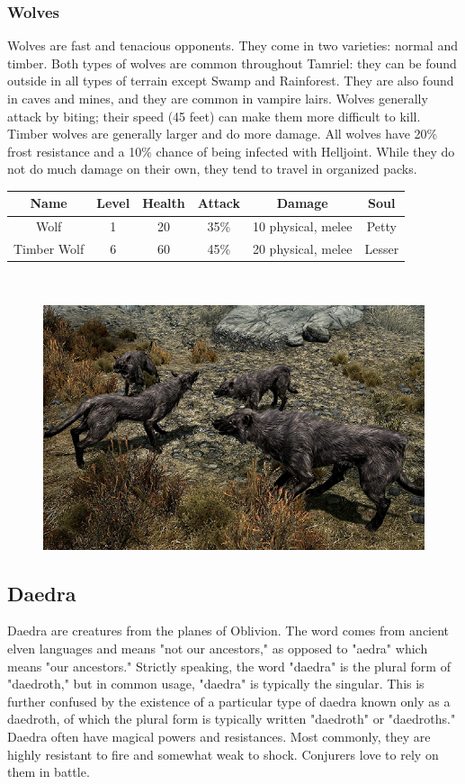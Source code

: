 \documentclass[12pt]{book}
\begin{document}
\subsubsection{Wolves}
Wolves are fast and tenacious opponents. They come in two varieties: normal and timber. Both types of wolves are common throughout Tamriel: they can be found outside in all types of terrain except Swamp and Rainforest. They are also found in caves and mines, and they are common in vampire lairs. Wolves generally attack by biting; their speed (45 feet) can make them more difficult to kill. Timber wolves are generally larger and do more damage. All wolves have 20\% frost resistance and a 10\% chance of being infected with Helljoint. While they do not do much damage on their own, they tend to travel in organized packs.

\begin{tabular}{|c|c|c|c|c|c|}
\hline
Name & Level & Health & Attack & Damage & Soul\\ \hline
Wolf & 1 & 20 & 35\% & 10 physical, melee & Petty\\ \hline
Timber Wolf & 6 & 60 & 45\% & 20 physical, melee & Lesser\\ \hline
\end{tabular}\\

\begin{figure}[h]
	\centering
	\includegraphics[scale=0.8]{wolves.png}
\end{figure}

\subsection{Daedra}
Daedra are creatures from the planes of Oblivion. The word comes from ancient elven languages and means "not our ancestors," as opposed to "aedra" which means "our ancestors." Strictly speaking, the word "daedra" is the plural form of "daedroth," but in common usage, "daedra" is typically the singular. This is further confused by the existence of a particular type of daedra known only as a daedroth, of which the plural form is typically written "daedroth" or "daedroths." Daedra often have magical powers and resistances. Most commonly, they are highly resistant to fire and somewhat weak to shock. Conjurers love to rely on them in battle.
\end{document}
